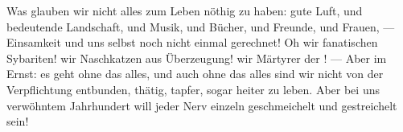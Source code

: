 Was glauben wir nicht alles zum Leben nöthig zu haben: gute Luft, und bedeutende Landschaft, und Musik, und Bücher, und Freunde, und Frauen, — Einsamkeit und uns selbst noch nicht einmal gerechnet! Oh wir fanatischen Sybariten! wir Naschkatzen aus Überzeugung! wir Märtyrer der ! — Aber im Ernst: es geht ohne das alles, und auch ohne das alles sind wir nicht von der Verpflichtung entbunden, thätig, tapfer, sogar heiter zu leben. Aber bei uns verwöhntem Jahrhundert will jeder Nerv einzeln geschmeichelt und gestreichelt sein!
\par

